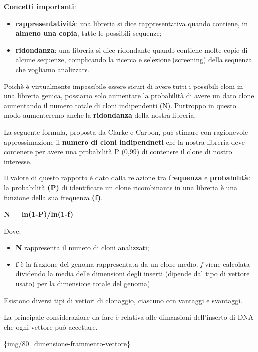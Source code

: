\documentclass[]{article}
\begin{document}
\textbf{Concetti importanti}:

\begin{itemize}
\itemsep1pt\parskip0pt
\item
  \textbf{rappresentatività}: una libreria si dice rappresentativa
  quando contiene, in \textbf{almeno una copia}, tutte le possibili
  sequenze;
\item
  \textbf{ridondanza}: una libreria si dice ridondante quando contiene
  molte copie di alcune sequenze, complicando la ricerca e selezione
  (screening) della sequenza che vogliamo analizzare.
\end{itemize}

Poichè è virtualmente impossibile essere sicuri di avere tutti i
possibili cloni in una libreria genica, possiamo solo aumentare la
probabilità di avere un dato clone aumentando il numero totale di cloni
indipendenti (N). Purtroppo in questo modo aumenteremo anche la
\textbf{ridondanza} della nostra libreria.

La seguente formula, proposta da Clarke e Carbon, può stimare con
ragionevole approssimazione il \textbf{numero di cloni indipendneti} che
la nostra libreria deve contenere per avere una probabilità P (0,99) di
contenere il clone di nostro interesse.

Il valore di questo rapporto è dato dalla relazione tra
\textbf{frequenza} e \textbf{probabilità}: la probabilità \textbf{(P)}
di identificare un clone ricombinante in una libreria è una funzione
della sua frequenza \textbf{(f)}.

\textbf{N = ln(1-P)/ln(1-f)}

Dove:

\begin{itemize}
\itemsep1pt\parskip0pt
\item
  \textbf{N} rappresenta il numero di cloni analizzati;
\item
  \textbf{f} è la frazione del genoma rappresentata da un clone medio.
  \emph{f} viene calcolata dividendo la media delle dimensioni degli
  inserti (dipende dal tipo di vettore usato) per la dimensione totale
  del genoma).
\end{itemize}

Esistono diversi tipi di vettori di clonaggio, ciascuno con vantaggi e
svantaggi.

La principale considerazione da fare è relativa alle dimensioni
dell'inserto di DNA che ogni vettore può accettare.

\{img/80\_dimensione-frammento-vettore\}
\end{document}
